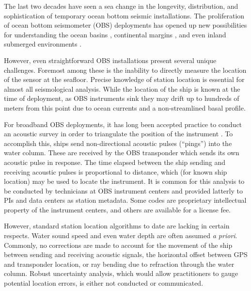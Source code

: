 The last two decades have seen a sea change in the longevity, distribution, and sophistication of temporary ocean bottom seismic installations. The proliferation of ocean bottom seismometer (OBS) deployments has opened up new possibilities for understanding the ocean basins \citep[e.g.][]{Lin2016,Takeo2016}, continental margins \citep[e.g.][]{Janiszewski2015,Hawley2016,Lynner2017,Eilon2017}, and even inland submerged environments \citep[e.g.][]{Accardo2017}. 

However, even straightforward OBS installations present several unique challenges. Foremost among these is the inability to directly measure the location of the sensor at the seafloor. Precise knowledge of station location is essential for almost all seismological analysis. While the location of the ship is known at the time of deployment, as OBS instruments sink they may drift up to hundreds of meters from this point due to ocean currents and a non-streamlined basal profile. 

For broadband OBS deployments, it has long been accepted practice to conduct an acoustic survey in order to triangulate the position of the instrument \citep[e.g.,][]{Creager1982}. To accomplish this, ships send non-directional acoustic pulses (``pings'') into the water column. These are received by the OBS transponder which sends its own acoustic pulse in response. The time elapsed between the ship sending and receiving acoustic pulses is proportional to distance, which (for known ship location) may be used to locate the instrument. It is common for this analysis to be conducted by technicians at OBS instrument centers and provided latterly to PIs and data centers as station metadata. Some codes are proprietary intellectual property of the instrument centers, and others are available for a license fee. 

However, standard station location algorithms to date are lacking in certain respects. Water sound speed and even water depth are often assumed \textit{a priori}. Commonly, no corrections are made to account for the movement of the ship between sending and receiving acoustic signals, the horizontal offset between GPS and transponder location, or ray bending due to refraction through the water column. Robust uncertainty analysis, which would allow practitioners to gauge potential location errors, is either not conducted or communicated.

